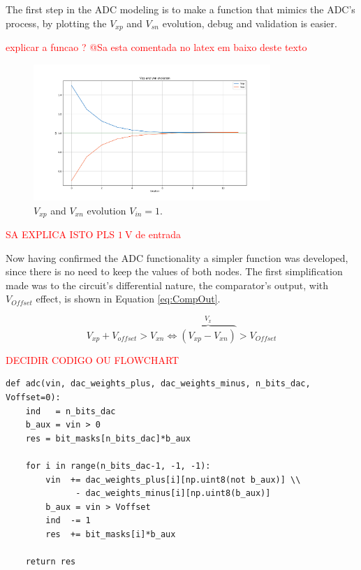 The first step in the ADC modeling is to make a function that mimics the ADC's process, by plotting the $V_{xp}$ and $V_{sn}$ evolution, debug and validation is easier.

\textcolor{red}{explicar a funcao ? @Sa esta comentada no latex em baixo deste texto}

\begin{figure}[H]

    \centering
    \includegraphics*[width=0.8\textwidth]{Images/Vxp_Vxn_evolution_1V_input.png}
    \caption{$V_{xp}$ and $V_{xn}$ evolution $V_{in} = 1$.}

    \label{fig:VxpVxnEvo}
\end{figure}
\textcolor{red}{SA EXPLICA ISTO PLS $\SI{1}{\volt}$ de entrada }

Now having confirmed the ADC functionality a simpler function was developed, since there is no need to keep the values of both nodes.
The first simplification made was to the circuit's differential nature, the comparator's output, with $V_{Offset}$ effect, is shown in Equation \ref{eq:CompOut}.

\begin{equation}
    V_{xp} + V_{offset} > V_{xn} \Leftrightarrow \overbrace{( V_{xp} - V_{xn} )}^{V_x} > V_{Offset} 
    \label{eq:CompOut}
\end{equation}

\textcolor{red}{DECIDIR CODIGO OU FLOWCHART}

\begin{lstlisting}[caption={ADC Function}]
def adc(vin, dac_weights_plus, dac_weights_minus, n_bits_dac, Voffset=0):
    ind   = n_bits_dac  
    b_aux = vin > 0
    res = bit_masks[n_bits_dac]*b_aux

    for i in range(n_bits_dac-1, -1, -1):
        vin  += dac_weights_plus[i][np.uint8(not b_aux)] \\
              - dac_weights_minus[i][np.uint8(b_aux)]
        b_aux = vin > Voffset
        ind  -= 1
        res  += bit_masks[i]*b_aux

    return res
\end{lstlisting}



